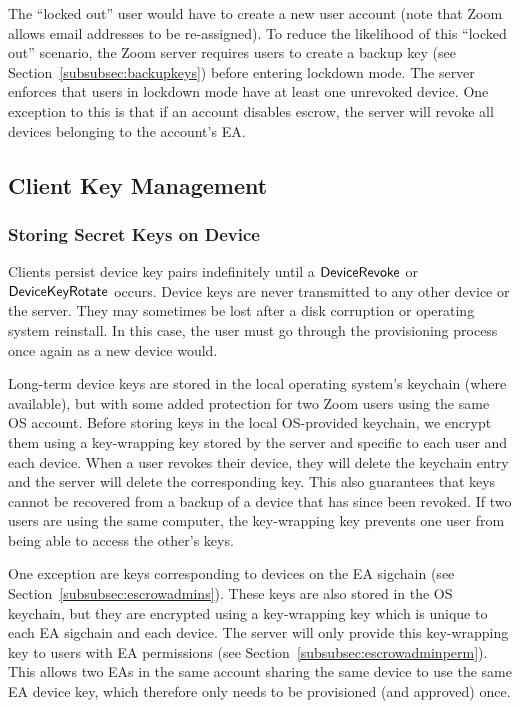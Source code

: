 The ``locked out'' user would have to create a new user account (note that Zoom allows email
addresses to be re-assigned). To reduce the likelihood of this ``locked out'' scenario, the Zoom
server requires users to create a backup key (see Section~\ref{subsubsec:backupkeys}) before
entering lockdown mode. The server enforces that users in lockdown mode have at least one unrevoked
device. One exception to this is that if an account disables escrow, the server will revoke all
devices belonging to the account's EA.



\subsection{Client Key Management}
\label{subsec:clientkeys}

\subsubsection{Storing Secret Keys on Device}
\label{subsec:lks}

Clients persist device key pairs indefinitely until a $\mathsf{DeviceRevoke}{}$ or $\mathsf{DeviceKeyRotate}{}$
occurs. Device keys are never transmitted to any other device or the server. They may sometimes be
lost after a disk corruption or operating system reinstall. In this case, the user must go through
the provisioning process once again as a new device would.

Long-term device keys are stored in the local operating system's keychain (where available), but
with some added protection for two Zoom users using the same OS account.
%
Before storing keys in the local OS-provided keychain, we encrypt them using a key-wrapping key
stored by the server and specific to each user and each device. 
%
When a user revokes their device, they will delete the keychain entry and the server will delete the
corresponding key. This also guarantees that keys cannot be recovered from a backup of a device that
has since been revoked.
%
If two users are using the same computer, the key-wrapping key prevents one user from being able to
access the other's keys. 

One exception are keys corresponding to devices on the EA sigchain (see
Section~\ref{subsubsec:escrowadmins}). These keys are also stored in the OS keychain, but they are
encrypted using a key-wrapping key which is unique to each EA sigchain and each device. The server
will only provide this key-wrapping key to users with EA permissions (see
Section~\ref{subsubsec:escrowadminperm}). This allows two EAs in the same account sharing the same
device to use the same EA device key, which therefore only needs to be provisioned (and approved)
once.

